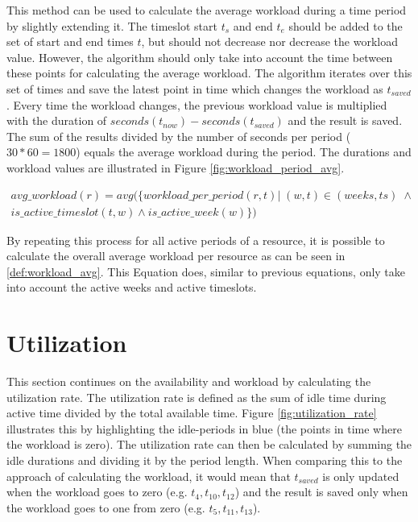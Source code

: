 This method can be used to calculate the average workload during a time period by slightly extending it. The timeslot start $t_s$ and end $t_e$ should be added to the set of start and end times $t$, but should not decrease nor decrease the workload value. However, the algorithm should only take into account the time between these points for calculating the average workload. The algorithm iterates over this set of times and save the latest point in time which changes the workload as $t_{saved}$. Every time the workload changes, the previous workload value is multiplied with the duration of $seconds(t_{now}) - seconds(t_{saved})$ and the result is saved. The sum of the results divided by the number of seconds per period ($30*60=1800$) equals the average workload during the period. The durations and workload values are illustrated in Figure \ref{fig:workload_period_avg}.

\begin{equation}\label{def:workload_avg}
  \begin{split}
    avg\_workload(r) = avg(\{workload\_per\_period(r,t) | \; (w, t) \in (weeks, ts) \; \wedge  & \\ is\_active\_timeslot(t, w) \wedge is\_active\_week(w)\}) & 
  \end{split}
\end{equation}

By repeating this process for all active periods of a resource, it is possible to calculate the overall average workload per resource as can be seen in \ref{def:workload_avg}. This Equation does, similar to previous equations, only take into account the active weeks and active timeslots.


\section{Utilization}
  This section continues on the availability and workload by calculating the utilization rate. The utilization rate is defined as the sum of idle time during active time divided by the total available time. Figure \ref{fig:utilization_rate} illustrates this by highlighting the idle-periods in blue (the points in time where the workload is zero). The utilization rate can then be calculated by summing the idle durations and dividing it by the period length. When comparing this to the approach of calculating the workload, it would mean that $t_{saved}$ is only updated when the workload goes to zero (e.g. $t_4,t_{10}, t_{12}$) and the result is saved only when the workload goes to one from zero (e.g. $t_5,t_{11},t_{13}$). 


